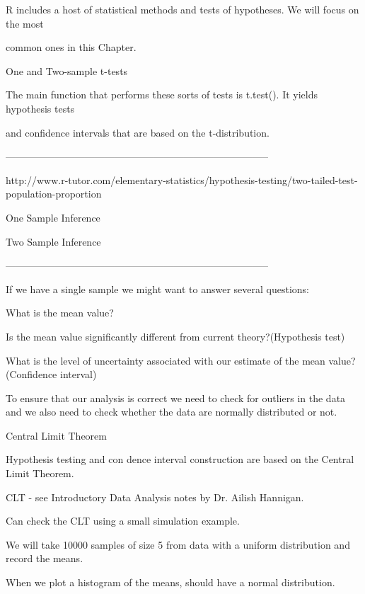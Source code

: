 \begin{frame}
R includes a host of statistical methods and tests of hypotheses. We will focus on the most

common ones in this Chapter.

One and Two-sample t-tests

The main function that performs these sorts of tests is t.test(). It yields hypothesis tests

and confidence intervals that are based on the t-distribution. 


 



--------------------------------------------------------------------------------
 

http://www.r-tutor.com/elementary-statistics/hypothesis-testing/two-tailed-test-population-proportion

 

One Sample Inference

Two Sample Inference



--------------------------------------------------------------------------------
 

If we have a single sample we might want to answer several questions:

 

What is the mean value?

Is the mean value significantly different from current theory?(Hypothesis test)

What is the level of uncertainty associated with our estimate of the mean value? (Confidence interval)

 

To ensure that our analysis is correct we need to check for outliers in the data and we also need to check whether the data are normally distributed or not.

  

 
Central Limit Theorem

Hypothesis testing and con dence interval construction are based on the Central Limit Theorem.

CLT - see Introductory Data Analysis notes by Dr. Ailish Hannigan.

Can check the CLT using a small simulation example.

We will take 10000 samples of size 5 from data with a uniform distribution and record the means.

When we plot a histogram of the means, should have a normal distribution.


\end{frame}
